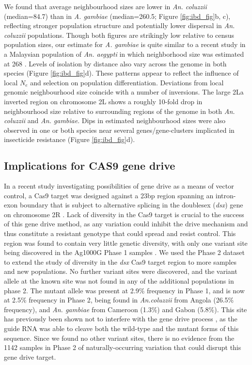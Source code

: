 \documentclass[a4paper,11pt,abstracton,hidelinks]{scrartcl}
\begin{document}
We found that average neighbourhood sizes are lower in \textit{An. coluzzii} (median=84.7) than in \textit{A. gambiae} (median=260.5; Figure \ref{fig:ibd_fig}b, c), reflecting stronger population structure and potentially lower dispersal in \textit{An. coluzzii} populations.
%
Though both figures are strikingly low relative to census population sizes, our estimate for \textit{A. gambiae} is quite similar to a recent study in a Malaysian population of \textit{An. aegypti} in which neighborhood size was estimated at 268 \cite{jasper2019genomic}.
%
Levels of isolation by distance also vary across the genome in both species (Figure \ref{fig:ibd_fig}d).
%
These patterns appear to reflect the influence of local $N_{e}$ and selection on population differentiation.
%
Deviations from local genomic neighbourhood size coincide with a number of inversions.
%
The large 2La inverted region on chromosome 2L shows a roughly 10-fold drop in neighbourhood size relative to surrounding regions of the genome in both \textit{An. coluzzii} and \textit{An. gambiae}.
%
Dips in estimated neighbourhood sizes were also observed in one or both species near several genes/gene-clusters implicated in insecticide resistance (Figure \ref{fig:ibd_fig}d). 



\subsection*{Implications for CAS9 gene drive}

In a recent study investigating possibilities of gene drive as a means of vector control, a Cas9 target was designed against a 23bp region spanning an intron-exon boundary that is subject to alternative splicing in the doublesex (\textit{dsx}) gene on chromosome 2R \cite{kyrou2018}.
%
Lack of diversity in the Cas9 target is crucial to the success of this gene drive method, as any variation could inhibit the drive mechanism and thus constitute a resistant genotype that could spread and resist control.
%
This region was found to contain very little genetic diversity, with only one variant site being discovered in the Ag1000G Phase 1 samples \cite{kyrou2018}.
%
We used the Phase 2 dataset to extend the study of diversity in the \textit{dsx} Cas9 target region to more samples and new populations. 
%
No further variant sites were discovered, and the variant allele at the known site was not found in any of the additional populations in phase 2.
%
The mutant allele was present at 2.9\% frequency in Phase 1, and is now at 2.5\% frequency in Phase 2, being found in \textit{An.coluzzii} from Angola (26.5\% frequency), and \textit{An. gambiae} from Cameroon (1.3\%) and Gabon (5.8\%).
%
This site has previously been shown not to interfere with the gene drive process \cite{kyrou2018}, as the guide RNA was able to cleave both the wild-type and the mutant forms of this sequence. 
%
Since we found no other variant sites, there is no evidence from the 1142 samples in Phase 2 of naturally-occurring variation that could disrupt this gene drive target. 
\end{document}

